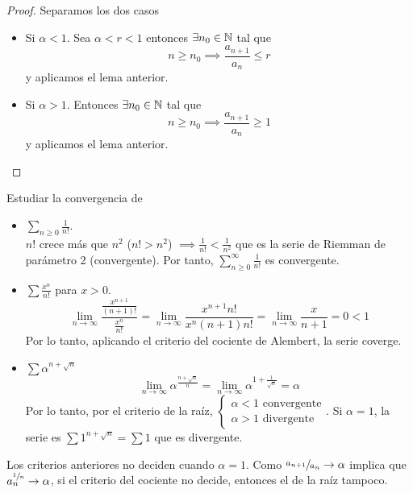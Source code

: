 \begin{proof}
	Separamos los dos casos
	\begin{itemize}
		\item Si $\alpha < 1$. Sea $\alpha < r < 1$ entonces $\exists n_0 \in \mathbb{N}$
		tal que
		\[
			n \geq n_0 \implies \frac{a_{n+1}}{a_n} \leq r
		\]
		y aplicamos el lema anterior.
		\item Si $\alpha > 1$. Entonces  $\exists n_0 \in \mathbb{N}$ tal que
		\[
			n \geq n_0 \implies \frac{a_{n+1}}{a_n} \geq 1
		\]
		y aplicamos el lema anterior.
	\end{itemize}
\end{proof}

\begin{example*}
	Estudiar la convergencia de 
	\begin{itemize}
		\item $\sum\limits_{n \geq 0} \frac{1}{n!}$. \\
			$n!$ crece más que	$n^2$ ($n! > n^2$) $\implies \frac{1}{n!} < \frac{1}{n^2}$
			que es la serie de Riemman de parámetro 2 (convergente). Por tanto,
			$\sum\limits_{n \geq 0}^\infty \frac{1}{n!}$ es convergente.
		\item $\sum \frac{x^n}{n!}$ para $x > 0$. \\
			\[
				\lim_{n \to \infty} \frac{\frac{x^{n+1}}{(n+1)!}}{\frac{x^n}{n!}} = 
				\lim_{n \to \infty} \frac{x^{n+1}n!}{x^n(n+1)n!} = \lim_{n \to \infty}
				\frac{x}{n+1} = 0 < 1
			\]
			Por lo tanto, aplicando el criterio del cociente de Alembert, la serie coverge.
		\item $\sum \alpha^{n+\sqrt{n}}$ \\
			\[
				\lim_{n \to \infty} \alpha^{\frac{n + \sqrt{n}}{n}} =
				\lim_{n \to \infty} \alpha^{1 + \frac{1}{\sqrt{n}}} = \alpha
			\]
			Por lo tanto, por el criterio de la raíz, $\begin{cases} \alpha < 1
			\text{ convergente} \\ \alpha > 1 \text{ divergente}\end{cases}$. Si $\alpha =1$,
			la serie es $\sum 1^{n + \sqrt{n}} = \sum 1$ que es divergente.
	\end{itemize}
\end{example*}

\begin{obs}
	Los criterios anteriores no deciden cuando $\alpha = 1$. Como $\sfrac{a_{n+1}}{a_n} \to
	\alpha$ implica que $a_n^{\sfrac{1}{n}} \to \alpha$, si el criterio del cociente no
	decide, entonces el de la raíz tampoco.
\end{obs}

